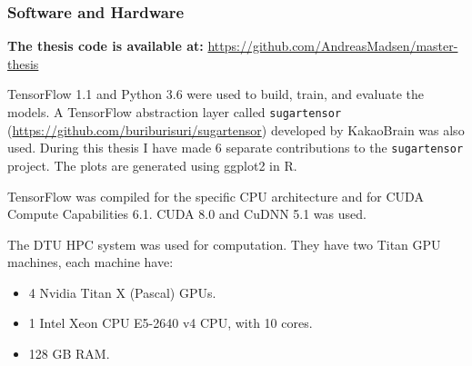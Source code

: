 \subsubsection{Software and Hardware}

\textbf{The thesis code is available at: } \url{https://github.com/AndreasMadsen/master-thesis}

TensorFlow 1.1 \cite{tensorflow2015-whitepaper} and Python 3.6 were used to build, train, and evaluate the models. A TensorFlow abstraction layer called \texttt{sugartensor} (\url{https://github.com/buriburisuri/sugartensor}) developed by KakaoBrain was also used. During this thesis I have made 6 separate contributions to the \texttt{sugartensor} project. The plots are generated using ggplot2 \cite{ggplot2} in R.

TensorFlow was compiled for the specific CPU architecture and for CUDA Compute Capabilities 6.1. CUDA 8.0 and CuDNN 5.1 was used.

The DTU HPC system was used for computation. They have two Titan GPU machines, each machine have:
\begin{itemize}[noitemsep]
\item 4 Nvidia Titan X (Pascal) GPUs.
\item 1 Intel Xeon CPU E5-2640 v4 CPU, with 10 cores.
\item 128 GB RAM.
\end{itemize}
